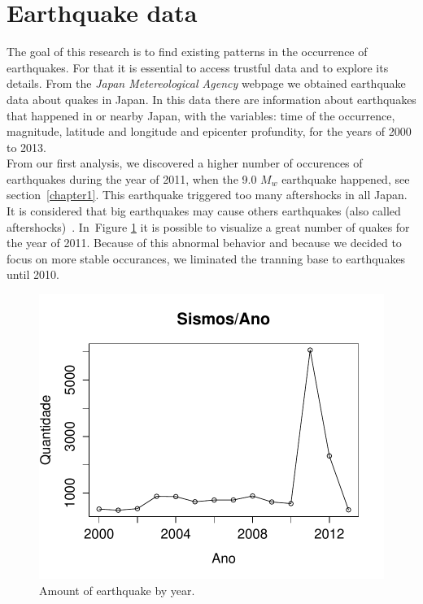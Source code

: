 \section{Earthquake data}
The goal of this research is to find existing patterns in the occurrence of earthquakes. For that it is essential to access trustful data and to explore its details. From the  {\it Japan Metereological Agency} webpage we obtained earthquake data about quakes in Japan. In this data there are information about earthquakes that happened in or nearby Japan,  with the variables: time of the occurrence, magnitude, latitude and longitude and epicenter profundity, for the years of 2000 to 2013.\\

From our first analysis, we discovered a higher number of occurences of earthquakes during the year of 2011, when the 9.0 $M_w$ earthquake happened, see section~\ref{chapter1}. This earthquake triggered too many aftershocks in all Japan. It is considered that big earthquakes may cause others earthquakes (also called aftershocks)~\cite{zhuang2004analyzing}. In~Figure \ref{ocorrenciasAno} it is possible to visualize a great number of quakes for the year of 2011. Because of this abnormal behavior and because we decided to focus on more stable occurances, we liminated the tranning base to earthquakes until 2010.\\

\begin{figure}[!htb]
\centering
\includegraphics[scale=0.9]{img/ocorrenciasAno.pdf}
\caption{Amount of earthquake by year.}
\label{ocorrenciasAno}
\end{figure}

